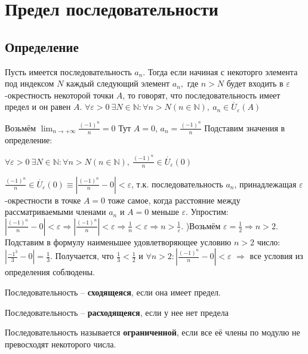 \chapter{Предел последовательности}
\section{Определение}
Пусть имеется последовательность $a_n$. Тогда если начиная с некоторго элемента под индексом $N$ 
каждый следующий элемент $a_n,$ где $n>N$ будет входить в $\varepsilon$-окрестность некоторой точки 
$A$, то говорят, что последовательность имеет предел и он равен $A$. \newline
$\forall \varepsilon > 0\ \exists N \in \mathbb{N} : \forall n > N(n \in \mathbb{N}),\ a_n \in 
\mathring{U_\varepsilon}(A)$
\begin{example}
Возьмём $\displaystyle \lim_{n \to +\infty}\frac{(-1)^n}{n} = 0$
\newline
Тут $A = 0$, $a_n = \frac{(-1)^n}{n}$
\newline
Подставим значения в определение:
\begin{center}$\forall\varepsilon > 0\ \exists N \in \mathbb{N} : \forall n > N(n \in \mathbb{N}),\ 
\frac{(-1)^n}{n} \in \mathring{U_\varepsilon}(0)$\end{center}
$\frac{(-1)^n}{n} \in \mathring{U_\varepsilon}(0) \equiv |\frac{(-1)^n}{n} - 0| < \varepsilon$, т.к. 
последовательность $a_n$, принадлежащая $\varepsilon$-окрестности в точке $A = 0$ тоже самое, когда 
расстояние между рассматриваемыми членами $a_n$ и $A = 0$ меньше $\varepsilon$.\newline
Упростим: $|\frac{(-1)^n}{n} - 0| < \varepsilon \Rightarrow |\frac{(-1)^n}{n}| < \varepsilon 
\Rightarrow \frac{1}{n} < \varepsilon \Rightarrow n > \frac{1}{\varepsilon} $. \newline
1)Возьмём $\varepsilon = \frac{1}{2} \Rightarrow n > 2$. Подставим в формулу наименьшее 
удовлетворяющее условию $n > 2$ число: $|\frac{-1^3}{3} - 0| = \frac{1}{3}$. Получается, что 
$\frac{1}{3} < \frac{1}{2}$ и $\forall n > 2: |\frac{(-1)^n}{n} - 0| < \varepsilon$ $\Rightarrow$ 
все условия из определения соблюдены. \newline
\end{example}

\begin{mydef}Последовательность -- \textbf{сходящеяся}, если она имеет предел.\end{mydef}
\begin{mydef}Последовательность -- \textbf{расходящеяся}, если у нее нет предела\end{mydef}
\begin{mydef}Последовательность называется \textbf{ограниченной}, если все её члены по модулю не 
превосходят некоторого числа.\end{mydef}

